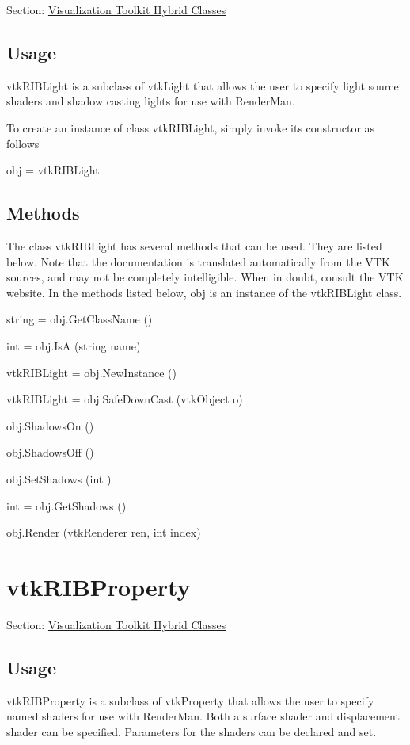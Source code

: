 Section\-: \hyperlink{sec_vtkhybrid}{Visualization Toolkit Hybrid Classes} \hypertarget{vtkwidgets_vtkxyplotwidget_Usage}{}\subsection{Usage}\label{vtkwidgets_vtkxyplotwidget_Usage}
vtk\-R\-I\-B\-Light is a subclass of vtk\-Light that allows the user to specify light source shaders and shadow casting lights for use with Render\-Man.

To create an instance of class vtk\-R\-I\-B\-Light, simply invoke its constructor as follows \begin{DoxyVerb}  obj = vtkRIBLight
\end{DoxyVerb}
 \hypertarget{vtkwidgets_vtkxyplotwidget_Methods}{}\subsection{Methods}\label{vtkwidgets_vtkxyplotwidget_Methods}
The class vtk\-R\-I\-B\-Light has several methods that can be used. They are listed below. Note that the documentation is translated automatically from the V\-T\-K sources, and may not be completely intelligible. When in doubt, consult the V\-T\-K website. In the methods listed below, {\ttfamily obj} is an instance of the vtk\-R\-I\-B\-Light class. 
\begin{DoxyItemize}
\item {\ttfamily string = obj.\-Get\-Class\-Name ()}  
\item {\ttfamily int = obj.\-Is\-A (string name)}  
\item {\ttfamily vtk\-R\-I\-B\-Light = obj.\-New\-Instance ()}  
\item {\ttfamily vtk\-R\-I\-B\-Light = obj.\-Safe\-Down\-Cast (vtk\-Object o)}  
\item {\ttfamily obj.\-Shadows\-On ()}  
\item {\ttfamily obj.\-Shadows\-Off ()}  
\item {\ttfamily obj.\-Set\-Shadows (int )}  
\item {\ttfamily int = obj.\-Get\-Shadows ()}  
\item {\ttfamily obj.\-Render (vtk\-Renderer ren, int index)}  
\end{DoxyItemize}\hypertarget{vtkhybrid_vtkribproperty}{}\section{vtk\-R\-I\-B\-Property}\label{vtkhybrid_vtkribproperty}
Section\-: \hyperlink{sec_vtkhybrid}{Visualization Toolkit Hybrid Classes} \hypertarget{vtkwidgets_vtkxyplotwidget_Usage}{}\subsection{Usage}\label{vtkwidgets_vtkxyplotwidget_Usage}
vtk\-R\-I\-B\-Property is a subclass of vtk\-Property that allows the user to specify named shaders for use with Render\-Man. Both a surface shader and displacement shader can be specified. Parameters for the shaders can be declared and set.

